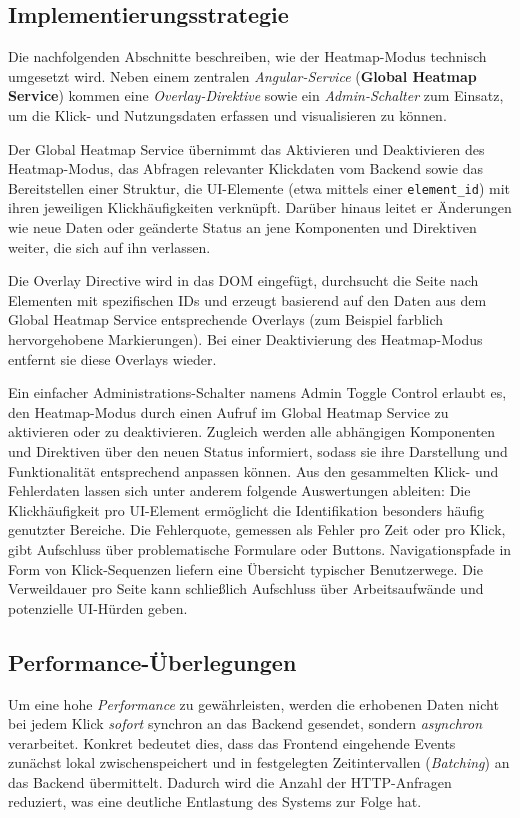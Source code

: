 \documentclass[12pt,oneside]{article}
\begin{document}
\subsection{Implementierungsstrategie}
Die nachfolgenden Abschnitte beschreiben, wie der Heatmap-Modus technisch umgesetzt wird. Neben einem zentralen \emph{Angular-Service} (\textbf{Global Heatmap Service}) kommen eine \emph{Overlay-Direktive} sowie ein \emph{Admin-Schalter} zum Einsatz, um die Klick- und Nutzungsdaten erfassen und visualisieren zu können.

Der Global Heatmap Service übernimmt das Aktivieren und Deaktivieren des Heatmap-Modus, das Abfragen relevanter Klickdaten vom Backend sowie das Bereitstellen einer Struktur, die UI-Elemente (etwa mittels einer \lstinline|element_id|) mit ihren jeweiligen Klickhäufigkeiten verknüpft. Darüber hinaus leitet er Änderungen wie neue Daten oder geänderte Status an jene Komponenten und Direktiven weiter, die sich auf ihn verlassen.

Die Overlay Directive wird in das DOM eingefügt, durchsucht die Seite nach Elementen mit spezifischen IDs und erzeugt basierend auf den Daten aus dem Global Heatmap Service entsprechende Overlays (zum Beispiel farblich hervorgehobene Markierungen). Bei einer Deaktivierung des Heatmap-Modus entfernt sie diese Overlays wieder.

Ein einfacher Administrations-Schalter namens Admin Toggle Control erlaubt es, den Heatmap-Modus durch einen Aufruf im Global Heatmap Service zu aktivieren oder zu deaktivieren. Zugleich werden alle abhängigen Komponenten und Direktiven über den neuen Status informiert, sodass sie ihre Darstellung und Funktionalität entsprechend anpassen können.
Aus den gesammelten Klick- und Fehlerdaten lassen sich unter anderem folgende Auswertungen ableiten: Die Klickhäufigkeit pro UI-Element ermöglicht die Identifikation besonders häufig genutzter Bereiche. Die Fehlerquote, gemessen als Fehler pro Zeit oder pro Klick, gibt Aufschluss über problematische Formulare oder Buttons. Navigationspfade in Form von Klick-Sequenzen liefern eine Übersicht typischer Benutzerwege. Die Verweildauer pro Seite kann schließlich Aufschluss über Arbeitsaufwände und potenzielle UI-Hürden geben.

\subsection{Performance-Überlegungen}
Um eine hohe \emph{Performance} zu gewährleisten, werden die erhobenen Daten nicht bei jedem Klick \emph{sofort} synchron an das Backend gesendet, sondern \emph{asynchron} verarbeitet. Konkret bedeutet dies, dass das Frontend eingehende Events zunächst lokal zwischenspeichert und in festgelegten Zeitintervallen (\emph{Batching}) an das Backend übermittelt. Dadurch wird die Anzahl der HTTP-Anfragen reduziert, was eine deutliche Entlastung des Systems zur Folge hat.
\end{document}
